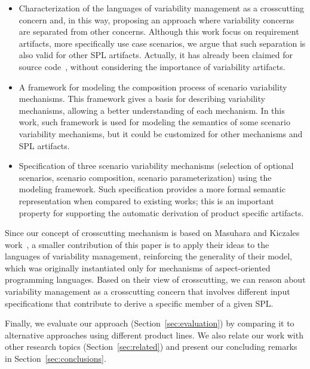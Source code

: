 \documentclass{acm_proc_article-sp}
\begin{document}
\begin{itemize}
\item Characterization of the languages of variability management as a crosscutting concern and, in this way, proposing an approach where variability concerns are separated from other concerns. Although this work focus on requirement artifacts, more specifically use case scenarios, we argue that such separation is also valid for other SPL artifacts. Actually, it has already been claimed for source code~\cite{Alves:2006aa,Apel:2006aa}, without considering the importance of variability artifacts.

\item A framework for modeling the composition process of scenario variability
mechanisms. This framework gives a basis for describing variability mechanisms,
allowing a better understanding of each mechanism. In this work, such framework
is used for modeling the semantics of some scenario variability mechanisms, but
it could be customized for other mechanisms and SPL artifacts.

\item Specification of three scenario variability mechanisms (selection of
optional scenarios, scenario composition, scenario parameterization) using the
modeling framework. Such specification provides a more formal semantic
representation when compared to existing works; this is an important property for
supporting the automatic derivation of product specific artifacts.
\end{itemize}

Since our concept of crosscutting mechanism is based on Masuhara and Kiczales
work~\cite{Masuhara:2003aa}, a smaller contribution of this paper is to apply
their ideas to the languages of variability management,  reinforcing the
generality of their model, which was originally instantiated only for mechanisms
of aspect-oriented programming languages. Based on their view of crosscutting, we
can reason about variability management as a crosscutting concern that involves
different input specifications that contribute to derive a specific member of a
given SPL.

Finally, we evaluate our approach (Section~\ref{sec:evaluation}) by comparing it
to alternative approaches using different product lines. We also relate our work
with other research topics (Section~\ref{sec:related}) and present our concluding
remarks in Section~\ref{sec:conclusions}.
\end{document}
